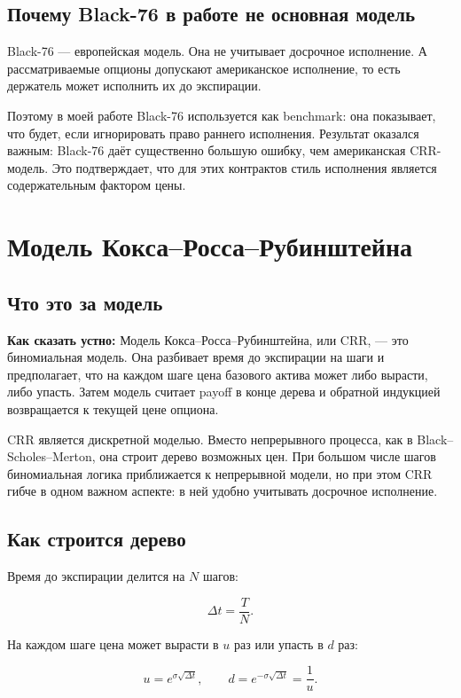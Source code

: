 \documentclass[11pt,a4paper]{article}
\newcommand{\speechbox}[1]{%
  \noindent\colorbox{softblue}{%
    \parbox{\dimexpr\linewidth-2\fboxsep\relax}{\textbf{Как сказать устно:} #1}%
  }\par\vspace{0.2em}
}
\begin{document}
\subsection{Почему Black-76 в работе не основная модель}

Black-76 --- европейская модель. Она не учитывает досрочное исполнение. А рассматриваемые опционы допускают американское исполнение, то есть держатель может исполнить их до экспирации.

Поэтому в моей работе Black-76 используется как benchmark: она показывает, что будет, если игнорировать право раннего исполнения. Результат оказался важным: Black-76 даёт существенно большую ошибку, чем американская CRR-модель. Это подтверждает, что для этих контрактов стиль исполнения является содержательным фактором цены.

\section{Модель Кокса--Росса--Рубинштейна}

\subsection{Что это за модель}

\speechbox{Модель Кокса--Росса--Рубинштейна, или CRR, --- это биномиальная модель. Она разбивает время до экспирации на шаги и предполагает, что на каждом шаге цена базового актива может либо вырасти, либо упасть. Затем модель считает payoff в конце дерева и обратной индукцией возвращается к текущей цене опциона.}

CRR является дискретной моделью. Вместо непрерывного процесса, как в Black--Scholes--Merton, она строит дерево возможных цен. При большом числе шагов биномиальная логика приближается к непрерывной модели, но при этом CRR гибче в одном важном аспекте: в ней удобно учитывать досрочное исполнение.

\subsection{Как строится дерево}

Время до экспирации делится на $N$ шагов:

\[
\Delta t=\frac{T}{N}.
\]

На каждом шаге цена может вырасти в $u$ раз или упасть в $d$ раз:

\[
u=e^{\sigma\sqrt{\Delta t}}, \qquad d=e^{-\sigma\sqrt{\Delta t}}=\frac{1}{u}.
\]
\end{document}
